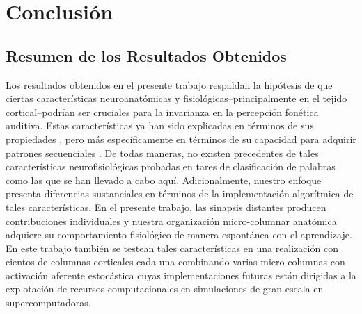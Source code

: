 \chapter{Conclusión}

\label{ch:conclusions}

\section{Resumen de los Resultados Obtenidos}

Los resultados obtenidos en el presente trabajo respaldan la hipótesis de que ciertas características neuroanatómicas y fisiológicas--principalmente en el tejido cortical--podrían ser cruciales para la invarianza en la percepción fonética auditiva. Estas características ya han sido explicadas en términos de sus propiedades \cite{hawkins_2016}, pero más específicamente en términos de su capacidad para adquirir patrones secuenciales \cite{cui_2016}. De todas maneras, no existen precedentes de tales características neurofisiológicas probadas en tares de clasificación de palabras como las que se han llevado a cabo aquí. Adicionalmente, nuestro enfoque presenta diferencias sustanciales en términos de la implementación algorítmica de tales características. En el presente trabajo, las sinapsis distantes producen contribuciones individuales y nuestra organización micro-columnar anatómica adquiere su comportamiento fisiológico de manera espontánea con el aprendizaje. En este trabajo también se testean tales características en una realización con cientos de columnas corticales cada una combinando varias micro-columnas con activación aferente estocástica cuyas implementaciones futuras están dirigidas a la explotación de recursos computacionales en simulaciones de gran escala en supercomputadoras. 


